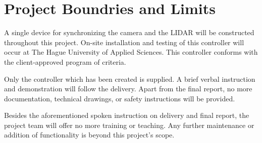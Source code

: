\chapter{Project Boundries and Limits}

A single device for synchronizing the camera and the LIDAR will be constructed throughout this project. On-site installation and testing of this controller will occur at The Hague University of Applied Sciences. This controller conforms with the client-approved program of criteria. 

\justify
Only the controller which has been created is supplied. A brief verbal instruction and demonstration will follow the delivery. Apart from the final report, no more documentation, technical drawings, or safety instructions will be provided. 

\justify
Besides the aforementioned spoken instruction on delivery and final report, the project team will offer no more training or teaching. Any further maintenance or addition of functionality is beyond this project's scope.